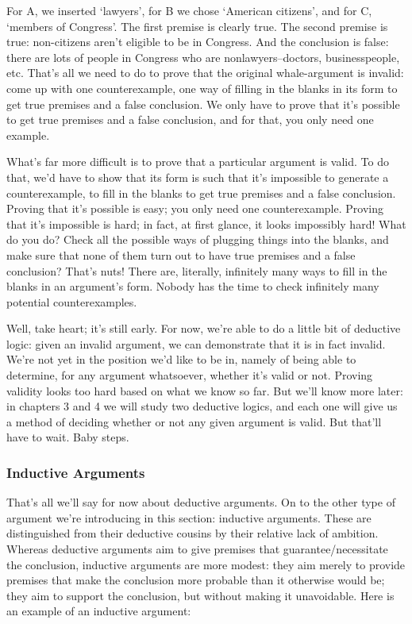 For A, we inserted `lawyers', for B we chose `American citizens', and for C, `members of
Congress'. The first premise is clearly true. The second premise is true: non-citizens aren't eligible
to be in Congress. And the conclusion is false: there are lots of people in Congress who are nonlawyers--doctors, businesspeople, etc.
That's all we need to do to prove that the original whale-argument is invalid: come up with one
counterexample, one way of filling in the blanks in its form to get true premises and a false
conclusion. We only have to prove that it's possible to get true premises and a false conclusion,
and for that, you only need one example.

What's far more difficult is to prove that a particular argument is valid. To do that, we'd have to
show that its form is such that it's impossible to generate a counterexample, to fill in the blanks to
get true premises and a false conclusion. Proving that it's possible is easy; you only need one
counterexample. Proving that it's impossible is hard; in fact, at first glance, it looks impossibly
hard! What do you do? Check all the possible ways of plugging things into the blanks, and make
sure that none of them turn out to have true premises and a false conclusion? That's nuts! There
are, literally, infinitely many ways to fill in the blanks in an argument's form. Nobody has the time
to check infinitely many potential counterexamples.

Well, take heart; it's still early. For now, we're able to do a little bit of deductive logic: given an
invalid argument, we can demonstrate that it is in fact invalid. We're not yet in the position we'd
like to be in, namely of being able to determine, for any argument whatsoever, whether it's valid
or not. Proving validity looks too hard based on what we know so far. But we'll know more later:
in chapters 3 and 4 we will study two deductive logics, and each one will give us a method of
deciding whether or not any given argument is valid. But that'll have to wait. Baby steps.

\subsubsection{Inductive Arguments}
That's all we'll say for now about deductive arguments. On to the other type of argument we're
introducing in this section: inductive arguments. These are distinguished from their deductive
cousins by their relative lack of ambition. Whereas deductive arguments aim to give premises that
guarantee/necessitate the conclusion, inductive arguments are more modest: they aim merely to
provide premises that make the conclusion more probable than it otherwise would be; they aim to
support the conclusion, but without making it unavoidable.
Here is an example of an inductive argument:

